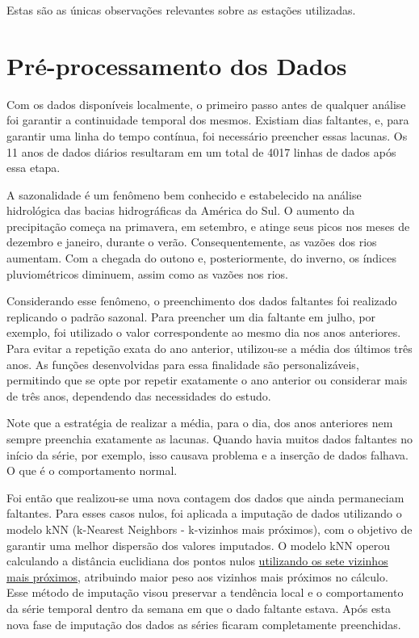 Estas são as únicas observações relevantes sobre as estações utilizadas.

\section{Pré-processamento dos Dados}

Com os dados disponíveis localmente, o primeiro passo antes de qualquer análise foi garantir a continuidade temporal dos mesmos. Existiam dias faltantes, e, para garantir uma linha do tempo contínua, foi necessário preencher essas lacunas. Os 11 anos de dados diários resultaram em um total de 4017 linhas de dados após essa etapa.

A sazonalidade é um fenômeno bem conhecido e estabelecido na análise hidrológica das bacias hidrográficas da América do Sul. O aumento da precipitação começa na primavera, em setembro, e atinge seus picos nos meses de dezembro e janeiro, durante o verão. Consequentemente, as vazões dos rios aumentam. Com a chegada do outono e, posteriormente, do inverno, os índices pluviométricos diminuem, assim como as vazões nos rios. \cite{rayyan-39677094}

Considerando esse fenômeno, o preenchimento dos dados faltantes foi realizado replicando o padrão sazonal. Para preencher um dia faltante em julho, por exemplo, foi utilizado o valor correspondente ao mesmo dia nos anos anteriores. Para evitar a repetição exata do ano anterior, utilizou-se a média dos últimos três anos. As funções desenvolvidas para essa finalidade são personalizáveis, permitindo que se opte por repetir exatamente o ano anterior ou considerar mais de três anos, dependendo das necessidades do estudo. 

Note que a estratégia de realizar a média, para o dia, dos anos anteriores nem sempre preenchia exatamente as lacunas. Quando havia muitos dados faltantes no início da série, por exemplo, isso causava problema e a inserção de dados falhava. O que é o comportamento normal.

Foi então que realizou-se uma nova contagem dos dados que ainda permaneciam faltantes. Para esses casos nulos, foi aplicada a imputação de dados utilizando o modelo kNN (k-Nearest Neighbors - k-vizinhos mais próximos), com o objetivo de garantir uma melhor dispersão dos valores imputados. O modelo kNN operou calculando a distância euclidiana dos pontos nulos \underline{utilizando os sete vizinhos mais próximos}, atribuindo maior peso aos vizinhos mais próximos no cálculo. Esse método de imputação visou preservar a tendência local e o comportamento da série temporal dentro da semana em que o dado faltante estava. Após esta nova fase de imputação dos dados as séries ficaram completamente preenchidas.

